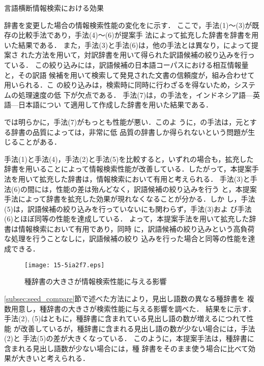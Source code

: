 \documentclass[japanese]{jnlp_1.4}
\newcommand{\tabref}[1]{}
\newcommand{\figref}[1]{}
\begin{document}
\begin{table}[b]
\caption{言語横断情報検索における効果}
\label{tbl:IR実験結果}
\begin{center}
\begin{small}

\end{small}
\end{center}
\end{table}

辞書を変更した場合の情報検索性能の変化を\tabref{tbl:IR実験結果}に示す．
ここで，手法(1)〜(3)が既存の比較手法であり，手法(4)〜(6)が提案手
法によって拡充した辞書を辞書を用いた結果である．
また，手法(3)と手法(6)は，他の手法とは異なり，\cite{IJCLIR}によって提案さ
れた方法を用いて，対訳辞書を用いて得られた訳語候補の絞り込みを行っている．
この絞り込みには，訳語候補の日本語コーパスにおける相互情報量と，その訳語
候補を用いて検索して発見された文書の信頼度が，組み合わせて用いられる．こ
の絞り込みは，検索時に同時に行わざるを得ないため，システムの処理速度の低
下が欠点である．
手法(7)は，\cite{日仏対訳辞書}の手法を，インドネシア語—英語—日本語につい
て適用して作成した辞書を用いた結果である．

\tabref{tbl:IR実験結果}では明らかに，手法(7)がもっとも性能が悪い．このよ
うに，\cite{日仏対訳辞書}の手法は，元とする辞書の品質によっては，非常に低
品質の辞書しか得られないという問題が生じることがある．

手法(1)と手法(4)，手法(2)と手法(5)を比較すると，いずれの場合も，拡充した
辞書を用いることによって情報検索性能が改善している．したがって，本提案手
法を用いて拡充した辞書は，情報検索において有用と考えられる．
手法(3)と手法(6)の間には，性能の差は殆んどなく，訳語候補の絞り込みを行う
と，本提案手法によって辞書を拡充した効果が現れなくなることが分かる．しか
し，手法(5)は，訳語候補の絞り込みを行っていないにも関わらず，手法(3)およ
び手法(6)とほぼ同等の性能を達成している．
よって，本提案手法を用いて拡充した辞書は情報検索において有用であり，同時
に，訳語候補の絞り込みという高負荷な処理を行うことなしに，訳語候補の絞り
込みを行った場合と同等の性能を達成できる．

\begin{figure}[b]
  \begin{center}
   \texttt{[image: 15-5ia2f7.eps]}
  \end{center}
  \caption{種辞書の大きさが情報検索性能に与える影響}
  \label{fig:RL_comparison}
\end{figure}

\ref{subsec:seed_compare}節で述べた方法により，見出し語数の異なる種辞書を
複数用意し，種辞書の大きさが検索性能に与える影響を調べた．
結果を\figref{fig:RL_comparison}に示す．
手法(2), (5)はともに，種辞書に含まれている見出し語の数が増えるにつれて性能
が改善しているが，種辞書に含まれる見出し語の数が少ない場合には，手法(2)と
手法(5)の差が大きくなっている．
このように，本提案手法は，種辞書に含まれる見出し語数が少ない場合には，種
辞書をそのまま使う場合に比べて効果が大きいと考えられる．
\end{document}

